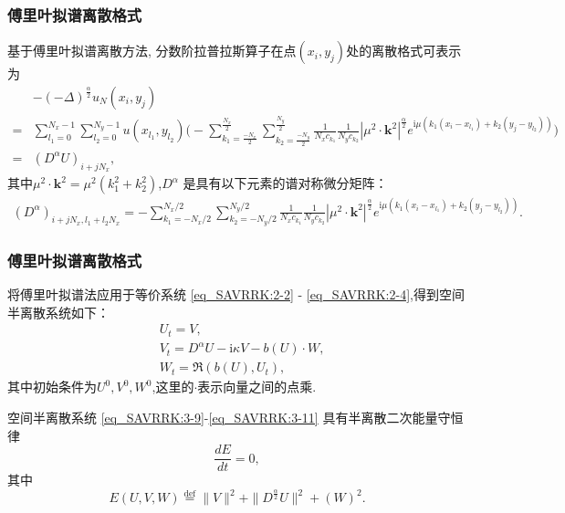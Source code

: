 \documentclass[aspectratio=169]{beamer}
\numberwithin{theorem}{section} %
\numberwithin{equation}{section}%
\numberwithin{figure}{section}%
\numberwithin{table}{section}%
\begin{document}
\begin{frame}\frametitle{傅里叶拟谱离散格式}
	基于傅里叶拟谱离散方法, 分数阶拉普拉斯算子在点$(x_i,y_j)$处的离散格式可表示为
\begin{align}
&-(-\Delta)^{\frac{\alpha}{2}} u_{N}\left(x_{i}, y_{j}\right)\nonumber\\
=&\sum\limits_{l_{1}=0}^{N_{x}-1} \sum\limits_{l_{2}=0}^{N_{y}-1}u(x_{l_{1}}, y_{l_{2}})\Big(-\sum\limits_{k_{1}=\frac{-N_{x}}{2}}^{\frac{N_{x}}{2}} \sum\limits_{k_{2}=\frac{-N_{y}}{2}}^{\frac{N_{y}}{2}} \frac{1}{N_{x} c_{k_{1}}} \frac{1}{N_{y} c_{k_{2}}}\left|\mu^{2} \cdot \mathbf{k}^{2}\right|^{\frac{\alpha}{2}} e^{\mathrm{i} \mu\left(k_{1}\left(x_{i}-x_{l_{1}}\right)+k_{2}\left(y_{j}-y_{l_{2}}\right)\right)}\Big)\nonumber\\
=&\left(D^{\alpha}U\right)_{i+j N_{x}},\label{eq_SAVRRK:53}
\end{align}
其中$\mu^{2} \cdot \mathbf{k}^{2}=\mu^{2}\left(k_{1}^{2}+k_{2}^{2}\right)$,$D^{\alpha}$ 是具有以下元素的谱对称微分矩阵：
\begin{align}\label{eq_SAVRRK:54}
\left(D^{\alpha}\right)_{i+j N_{x}, l_{1}+l_{2} N_{x}}=-\sum\limits_{k_{1}=-N_{x} / 2}^{N_{x} / 2} \sum\limits_{k_{2}=-N_{y} / 2}^{N_{y} / 2}\frac{1}{N_{x} c_{k_{1}}} \frac{1}{N_{y} c_{k_{2}}}\left|\mu^{2} \cdot \mathbf{k}^{2}\right|^{\frac{\alpha}{2}} e^{\mathrm{i}\mu\left(k_{1}\left(x_{i}-x_{l_{1}}\right)+k_{2}\left(y_{j}-y_{l_{2}}\right)\right)}.
\end{align}
\end{frame}

\begin{frame}\frametitle{傅里叶拟谱离散格式}
将傅里叶拟谱法应用于等价系统 \eqref{eq_SAVRRK:2-2} - \eqref{eq_SAVRRK:2-4},得到空间半离散系统如下：
{\color{purple}\begin{align}
& U_t=V, \label{eq_SAVRRK:3-9}\\
& V_t=D^{\alpha} U-\mathrm{i}\kappa V- b(U) \cdot W, \label{eq_SAVRRK:3-10}\\
& W_t=\Re\left(b(U), U_t\right),\label{eq_SAVRRK:3-11}
\end{align}}
其中初始条件为$U^0, V^0, W^0$,这里的$\cdot$表示向量之间的点乘.
\begin{theorem}	\label{thm3}
	空间半离散系统 \eqref{eq_SAVRRK:3-9}-\eqref{eq_SAVRRK:3-11} 具有半离散二次能量守恒律
	\begin{equation}
	\frac{dE}{dt}=0, \label{eq_SAVRRK:313a}
	\end{equation}
	其中
	\begin{equation}
	E(U,V,W)\overset{\text{def}}{=}\|V\|^2 + \|D^\frac{\alpha}{2} U\|^2+\left(W\right)^2.\label{eq_SAVRRK:313}
	\end{equation}
	\end{theorem}
\end{frame}
\end{document}
